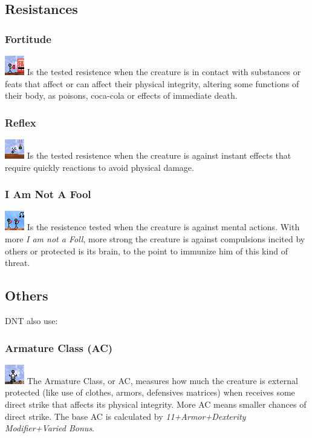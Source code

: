 \documentclass[ letterpaper,12pt]{article}
\begin{document}
\subsection{Resistances}

\subsubsection{Fortitude}
\includegraphics{../data/skills/Img/fortitude.png}
Is the tested resistence when the creature is in contact with substances or feats that affect or can affect their physical integrity, altering some functions of their body, as poisons, coca-cola or effects of immediate death.

\subsubsection{Reflex}
\includegraphics{../data/skills/Img/reflexos.png}
Is the tested resistence when the creature is against instant effects that require quickly reactions to avoid physical damage.

\subsubsection{I Am Not A Fool}
\includegraphics{../data/skills/Img/vontade.png}
Is the resistence tested when the creature is against mental actions. With more {\it I am not a Foll}, more strong the creature is against compulsions incited by others or protected is its brain, to the point to immunize him of this kind of threat.

\subsection{Others}
DNT also use:

\subsubsection{Armature Class (AC)}
\includegraphics{../data/skills/Img/ca.png}
The Armature Class, or AC, measures how much the creature is external protected (like use of clothes, armors, defensives matrices) when receives some direct strike that affects its physical integrity. More AC means smaller chances of direct strike. The base AC is calculated by {\it 11+Armor+Dexterity Modifier+Varied Bonus}.
\end{document}
